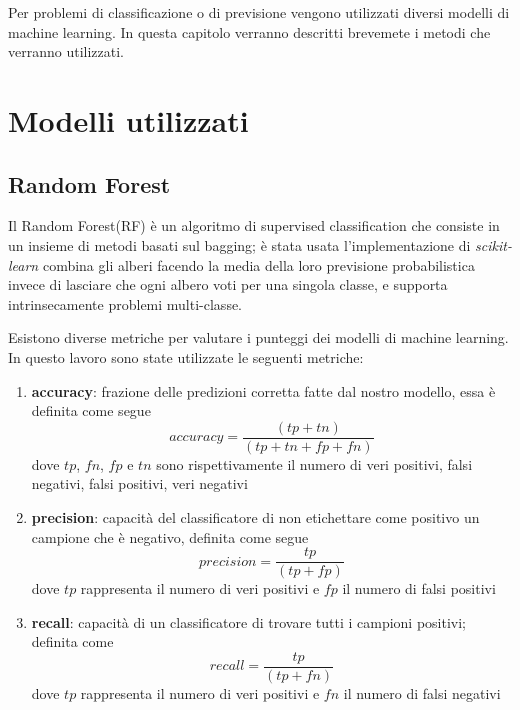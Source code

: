 Per problemi di classificazione o di previsione vengono utilizzati diversi modelli di machine learning. In questa capitolo verranno descritti brevemete i metodi che verranno utilizzati.
\section{Modelli utilizzati}
\subsection{Random Forest}
Il Random Forest(RF) è un algoritmo di supervised classification che consiste in un insieme di metodi basati sul bagging\cite{Random Forest}; è stata usata l'implementazione di \textit{scikit-learn} combina gli alberi facendo la media della loro previsione probabilistica invece di lasciare che ogni albero voti per una singola classe, e supporta intrinsecamente problemi multi-classe.

Esistono diverse metriche per valutare i punteggi dei modelli di machine learning. In questo lavoro sono state utilizzate le seguenti metriche:

\begin{enumerate}
    \item \textbf{accuracy}: frazione delle predizioni corretta fatte dal nostro modello, essa è definita come segue
    \begin{equation*} accuracy = \dfrac {(tp + tn)}{(tp + tn + fp + fn)}\end{equation*} 
    dove $tp$, $fn$, $fp$ e $tn$ sono rispettivamente il numero di veri positivi, falsi negativi, falsi positivi, veri negativi
    
    \item \textbf{precision}: capacità del classificatore di non etichettare come positivo un campione che è negativo, definita come segue
    \begin{equation*} precision = \dfrac {tp}{(tp + fp)}\end{equation*} 
    dove $tp$ rappresenta il numero di veri positivi e $fp$ il numero di falsi positivi
    
    \item \textbf{recall}: capacità di un classificatore di trovare tutti i campioni positivi; definita come
    \begin{equation*} recall = \dfrac {tp}{(tp + fn)}\end{equation*} 
    dove $tp$ rappresenta il numero di veri positivi e $fn$ il numero di falsi negativi
    
\end{enumerate}{}

